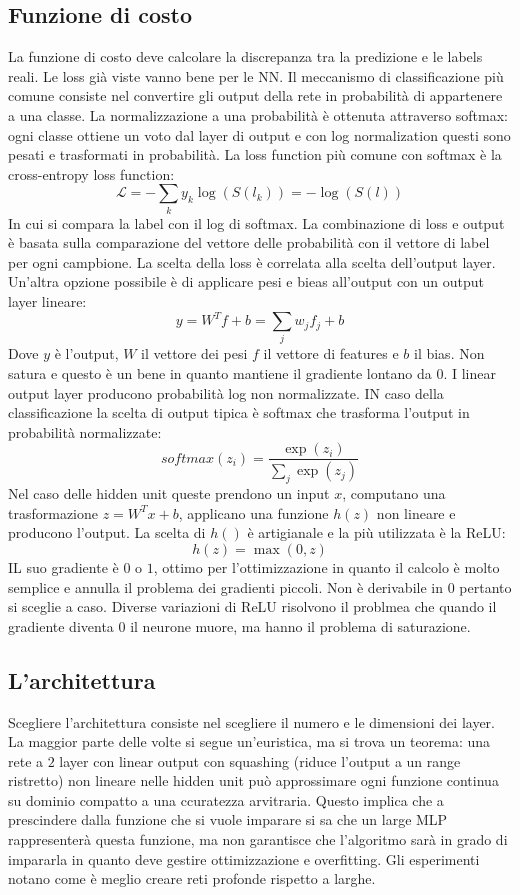	\subsection{Funzione di costo}
	La funzione di costo deve calcolare la discrepanza tra la predizione e le labels reali.
	Le loss gi\`a viste vanno bene per le NN.
	Il meccanismo di classificazione pi\`u comune consiste nel convertire gli output della rete in probabilit\`a di appartenere a una classe.
	La normalizzazione a una probabilit\`a \`e ottenuta attraverso softmax: ogni classe ottiene un voto dal layer di output e con log normalization questi sono pesati e trasformati in probabilit\`a.
	La loss function pi\`u comune con softmax \`e la cross-entropy loss function:
	$$\mathcal{L} = - \sum\limits_k y_k\log(S(l_k)) = -\log(S(l))$$
	In cui si compara la label con il log di softmax.
	La combinazione di loss e output \`e basata sulla comparazione del vettore delle probabilit\`a con il vettore di label per ogni campbione.
	La scelta della loss \`e correlata alla scelta dell'output layer.
	Un'altra opzione possibile \`e di applicare pesi e bieas all'output con un output layer lineare:
	$$y = W^Tf+b = \sum\limits_jw_jf_j + b$$
	Dove $y$ \`e l'output, $W$ il vettore dei pesi $f$ il vettore di features e $b$ il bias.
	Non satura e questo \`e un bene in quanto mantiene il gradiente lontano da $0$.
	I linear output layer producono probabilit\`a log non normalizzate.
	IN caso della classificazione la scelta di output tipica \`e softmax che trasforma l'output in probabilit\`a normalizzate:
	$$softmax(z_i) = \frac{\exp(z_i)}{\sum\limits_j\exp(z_j)}$$
	Nel caso delle hidden unit queste prendono un input $x$, computano una trasformazione $z = W^Tx+b$, applicano una funzione $h(z)$ non lineare e producono l'output.
	La scelta di $h()$ \`e artigianale e la pi\`u utilizzata \`e la ReLU:
	$$h(z) = \max(0,z)$$
	IL suo gradiente \`e $0$ o $1$, ottimo per l'ottimizzazione in quanto il calcolo \`e molto semplice e annulla il problema dei gradienti piccoli.
	Non \`e derivabile in $0$ pertanto si sceglie a caso.
	Diverse variazioni di ReLU risolvono il problmea che quando il gradiente diventa $0$ il neurone muore, ma hanno il problema di saturazione.

	\subsection{L'architettura}
	Scegliere l'architettura consiste nel scegliere il numero e le dimensioni dei layer.
	La maggior parte delle volte si segue un'euristica, ma si trova un teorema: una rete a $2$ layer con linear output con squashing (riduce l'output a un range ristretto) non lineare nelle hidden unit pu\`o approssimare ogni funzione continua su dominio compatto a una ccuratezza arvitraria.
	Questo implica che a prescindere dalla funzione che si vuole imparare si sa che un large MLP rappresenter\`a questa funzione, ma non garantisce che l'algoritmo sar\`a in grado di impararla in quanto deve gestire ottimizzazione e overfitting.
	Gli esperimenti notano come \`e meglio creare reti profonde rispetto a larghe.

